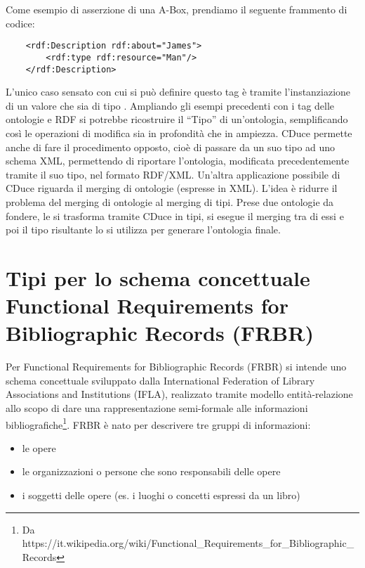 Come esempio di asserzione di una A-Box, prendiamo il seguente frammento di codice:
\begin{verbatim}
    <rdf:Description rdf:about="James">
        <rdf:type rdf:resource="Man"/>
    </rdf:Description>
\end{verbatim}
L'unico caso sensato con cui si può definire questo tag è tramite l'instanziazione di un valore  che sia di tipo . 
Ampliando gli esempi precedenti con i tag delle ontologie e RDF si potrebbe ricostruire il “Tipo” di un'ontologia, semplificando così le operazioni di 
modifica sia in profondità che in  ampiezza. CDuce permette anche di fare il procedimento opposto, cioè di passare da un suo tipo ad uno schema XML, 
permettendo di riportare l'ontologia, modificata precedentemente tramite il suo tipo, nel formato RDF/XML.
Un'altra applicazione possibile di CDuce riguarda il merging di ontologie (espresse in XML). L'idea è ridurre il problema del merging di ontologie al 
merging di tipi. Prese due ontologie da fondere, le si trasforma tramite CDuce in tipi, si esegue il merging tra di essi e poi il tipo risultante lo si 
utilizza per generare l'ontologia finale.

\section{\large Tipi per lo schema concettuale Functional Requirements for Bibliographic Records (FRBR)}
Per Functional Requirements for Bibliographic Records (FRBR) si intende uno schema concettuale sviluppato dalla International Federation of Library 
Associations and Institutions (IFLA), realizzato tramite modello entità-relazione allo scopo di dare una rappresentazione semi-formale alle informazioni 
bibliografiche\footnote{Da https://it.wikipedia.org/wiki/Functional_Requirements_for_Bibliographic_Records}. FRBR è nato per descrivere tre gruppi di 
informazioni:

\begin{itemize}
    \item le opere
    \item le organizzazioni o persone che sono responsabili delle opere
    \item i soggetti delle opere (es. i luoghi o concetti espressi da un libro)
\end{itemize}

